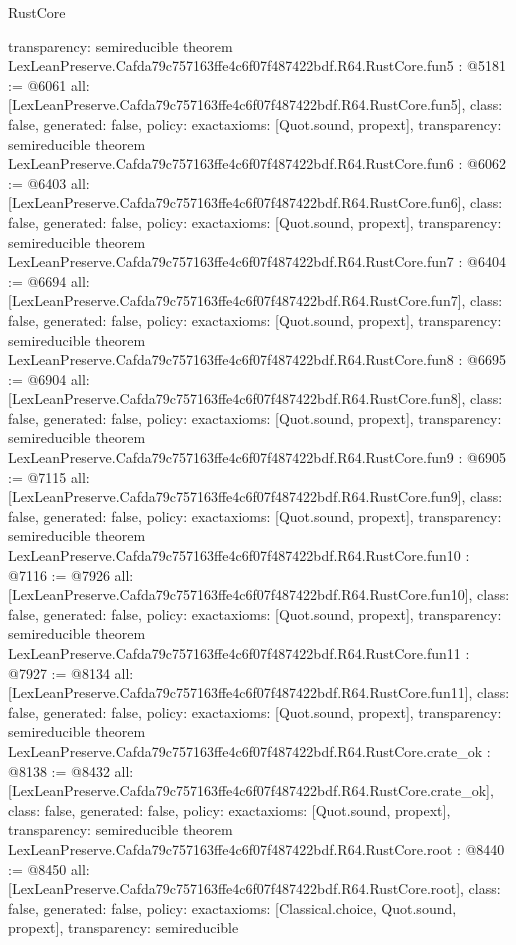 \begin{lexlean}{RustCore}
\begin{coremodule}
{  transparency: semireducible
}
theorem LexLeanPreserve.Cafda79c757163ffe4c6f07f487422bdf.R64.RustCore.fun5 : @5181 := @6061 {
  all: [LexLeanPreserve.Cafda79c757163ffe4c6f07f487422bdf.R64.RustCore.fun5],
  class: false,
  generated: false,
  policy: exact{axioms: [Quot.sound, propext]},
  transparency: semireducible
}
theorem LexLeanPreserve.Cafda79c757163ffe4c6f07f487422bdf.R64.RustCore.fun6 : @6062 := @6403 {
  all: [LexLeanPreserve.Cafda79c757163ffe4c6f07f487422bdf.R64.RustCore.fun6],
  class: false,
  generated: false,
  policy: exact{axioms: [Quot.sound, propext]},
  transparency: semireducible
}
theorem LexLeanPreserve.Cafda79c757163ffe4c6f07f487422bdf.R64.RustCore.fun7 : @6404 := @6694 {
  all: [LexLeanPreserve.Cafda79c757163ffe4c6f07f487422bdf.R64.RustCore.fun7],
  class: false,
  generated: false,
  policy: exact{axioms: [Quot.sound, propext]},
  transparency: semireducible
}
theorem LexLeanPreserve.Cafda79c757163ffe4c6f07f487422bdf.R64.RustCore.fun8 : @6695 := @6904 {
  all: [LexLeanPreserve.Cafda79c757163ffe4c6f07f487422bdf.R64.RustCore.fun8],
  class: false,
  generated: false,
  policy: exact{axioms: [Quot.sound, propext]},
  transparency: semireducible
}
theorem LexLeanPreserve.Cafda79c757163ffe4c6f07f487422bdf.R64.RustCore.fun9 : @6905 := @7115 {
  all: [LexLeanPreserve.Cafda79c757163ffe4c6f07f487422bdf.R64.RustCore.fun9],
  class: false,
  generated: false,
  policy: exact{axioms: [Quot.sound, propext]},
  transparency: semireducible
}
theorem LexLeanPreserve.Cafda79c757163ffe4c6f07f487422bdf.R64.RustCore.fun10 : @7116 := @7926 {
  all: [LexLeanPreserve.Cafda79c757163ffe4c6f07f487422bdf.R64.RustCore.fun10],
  class: false,
  generated: false,
  policy: exact{axioms: [Quot.sound, propext]},
  transparency: semireducible
}
theorem LexLeanPreserve.Cafda79c757163ffe4c6f07f487422bdf.R64.RustCore.fun11 : @7927 := @8134 {
  all: [LexLeanPreserve.Cafda79c757163ffe4c6f07f487422bdf.R64.RustCore.fun11],
  class: false,
  generated: false,
  policy: exact{axioms: [Quot.sound, propext]},
  transparency: semireducible
}
theorem LexLeanPreserve.Cafda79c757163ffe4c6f07f487422bdf.R64.RustCore.crate_ok : @8138 := @8432 {
  all: [LexLeanPreserve.Cafda79c757163ffe4c6f07f487422bdf.R64.RustCore.crate_ok],
  class: false,
  generated: false,
  policy: exact{axioms: [Quot.sound, propext]},
  transparency: semireducible
}
theorem LexLeanPreserve.Cafda79c757163ffe4c6f07f487422bdf.R64.RustCore.root : @8440 := @8450 {
  all: [LexLeanPreserve.Cafda79c757163ffe4c6f07f487422bdf.R64.RustCore.root],
  class: false,
  generated: false,
  policy: exact{axioms: [Classical.choice, Quot.sound, propext]},
  transparency: semireducible
}


\end{coremodule}
\end{lexlean}
